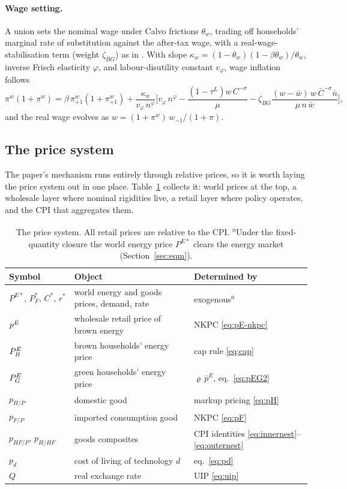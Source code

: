 \paragraph{Wage setting.}
A union sets the nominal wage under Calvo frictions $\theta_w$, trading off
households' marginal rate of substitution against the after-tax wage, with a
real-wage-stabilisation term (weight $\zeta_{BG}$) as in
\citet{ARS2024}. With slope $\kappa_w=(1-\theta_w)(1-\beta\theta_w)/\theta_w$,
inverse Frisch elasticity $\varphi$, and labour-disutility constant $v_\varphi$,
wage inflation follows
%
\begin{equation}
\pi^w(1+\pi^w)
= \beta\,\pi^w_{+1}(1+\pi^w_{+1})
+ \frac{\kappa_w}{v_\varphi\,n^{\varphi}}
\biggl[v_\varphi\,n^{\varphi}
- \frac{(1-\tau^L)w\,C^{-\sigma}}{\mu}
- \zeta_{BG}\frac{(w-\bar w)\,w\,\bar C^{-\sigma}\bar n}{\mu\,n\,\bar w}\biggr],
\label{eq:wpc}
\end{equation}
%
and the real wage evolves as $w=(1+\pi^w)\,w_{-1}/(1+\pi)$.

\subsection{The price system}\label{sec:prices}

The paper's mechanism runs entirely through relative prices, so it is worth laying
the price system out in one place. Table~\ref{tab:prices} collects it: world
prices at the top, a wholesale layer where nominal rigidities live, a retail layer
where policy operates, and the CPI that aggregates them.

\begin{table}[H]
\centering\small
\begin{tabular}{lll}
\toprule
Symbol & Object & Determined by \\
\midrule
$P^{E*},\,P^{*}_F,\,C^{*},\,r^{*}$ & world energy and goods prices, demand, rate &
exogenous\textsuperscript{a} \\
$p^{E}$ & wholesale retail price of brown energy & NKPC \eqref{eq:pE-nkpc} \\
$P^{E}_{B}$ & brown households' energy price & cap rule \eqref{eq:cap} \\
$P^{E}_{G}$ & green households' energy price & $\varrho\,\bar p^E$, eq.~\eqref{eq:pEG2} \\
$p_{H/P}$ & domestic good & markup pricing \eqref{eq:pH} \\
$p_{F/P}$ & imported consumption good & NKPC \eqref{eq:pF} \\
$p_{HF/P},\,p_{H/HF}$ & goods composites & CPI identities
\eqref{eq:innernest}--\eqref{eq:outernest} \\
$p_d$ & cost of living of technology $d$ & eq.~\eqref{eq:pd} \\
$Q$ & real exchange rate & UIP \eqref{eq:uip} \\
\bottomrule
\end{tabular}
\caption{The price system. All retail prices are relative to the CPI.
\textsuperscript{a}Under the fixed-quantity closure the world energy price
$P^{E*}$ clears the energy market (Section~\ref{sec:eqm}).}
\label{tab:prices}
\end{table}


